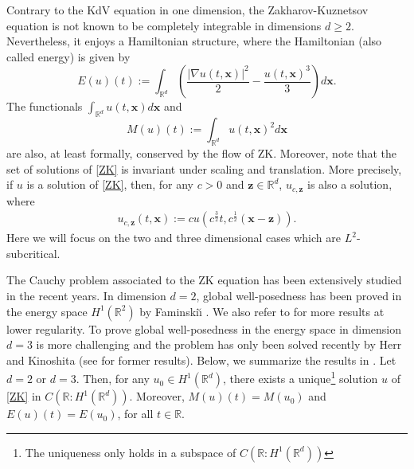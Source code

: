 \documentclass[reqno,10pt]{amsart}
\numberwithin{equation}{section}
\newcommand{\bx}{\mathbf{x}}
\newcommand{\bz}{\mathbf{z}}
\begin{document}
	Contrary to the KdV equation in one dimension, the Zakharov-Kuznetsov equation is not known to be completely integrable in dimensions $d \ge 2$. Nevertheless, it enjoys a Hamiltonian structure, where the Hamiltonian (also called energy) is given by
	\begin{equation} \label{def:energy}
		E(u)(t) := \int_{\mathbb{R}^d} \left( \frac{\vert \nabla u(t,\bx) \vert^2}{2} - \frac{u(t,\bx)^3}{3} \right) d\bx .
	\end{equation}
	The functionals $\int_{\mathbb{R}^d} u(t,\bx) d\bx$ and 
	\begin{equation} \label{def:mass}
		M(u)(t) := \int_{\mathbb{R}^d} u(t,\bx)^2 d\bx
	\end{equation}
	are also, at least formally, conserved by the flow of ZK. 
	Moreover, note that the set of solutions of \eqref{ZK} is invariant under scaling and translation. More precisely, if $u$ is a solution of \eqref{ZK}, then, for any $c>0$ and $\bz \in \mathbb R^d$, $u_{c,\bz}$ is also a solution, where
	\begin{align*}
		u_{c,\bz}(t,\bx) := c u (c^\frac32 t, c^{\frac12} (\bx-\bz)).
	\end{align*}
	Here we will focus on the two and three dimensional cases which are $L^2$-subcritical. 
	
	The Cauchy problem associated to the ZK equation has been extensively studied in the recent years. In dimension $d=2$, global well-posedness has been proved in the energy space $H^1(\mathbb R^2)$ by Faminski\u{\i} \cite{Fam}. We also refer to \cite{LiPa,GruHe,MoPi,Kino} for more results at lower regularity. To prove global well-posedness in the energy space in dimension $d=3$ is more challenging and the problem has only been solved recently by Herr and Kinoshita \cite{HeKin} (see \cite{LiSa,RiVe,MoPi} for former results). Below, we summarize the results in \cite{Fam,HeKin}. Let $d=2$ or $d=3$. Then, for any $u_0 \in H^1(\mathbb R^d)$, there exists a unique\footnote{The uniqueness only holds in a subspace of $C(\mathbb R : H^1(\mathbb R^d))$} solution $u$ of \eqref{ZK} in $C(\mathbb R : H^1(\mathbb R^d))$. Moreover, $M(u)(t)=M(u_0)$ and $E(u)(t)=E(u_0)$, for all $t \in \mathbb R$. 
	
\end{document}
